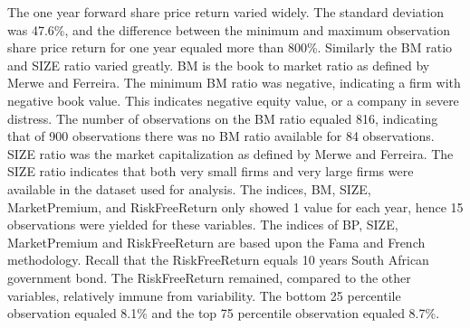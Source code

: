 The one year forward share price return varied widely. The standard deviation was 47.6\%, and the difference between the minimum and maximum observation share price return for one year equaled more than 800\%. Similarly the BM ratio and SIZE ratio varied greatly. BM is the book to market ratio as defined by Merwe and Ferreira. The minimum BM ratio was negative, indicating a firm with negative book value. This indicates negative equity value, or a company in severe distress. The number of observations on the BM ratio equaled 816, indicating that of 900 observations there was no BM ratio available for 84 observations. SIZE ratio was the market capitalization as defined by Merwe and Ferreira. The SIZE ratio indicates that both very small firms and very large firms were available in the dataset used for analysis. The indices, BM, SIZE, MarketPremium, and RiskFreeReturn only showed 1 value for each year, hence 15 observations were yielded for these variables. The indices of BP, SIZE, MarketPremium and RiskFreeReturn are based upon the Fama and French methodology. Recall that the RiskFreeReturn equals 10 years South African government bond. The RiskFreeReturn remained, compared to the other variables,  relatively immune from variability. The bottom 25 percentile  observation equaled 8.1\% and the top 75 percentile observation equaled 8.7\%.

